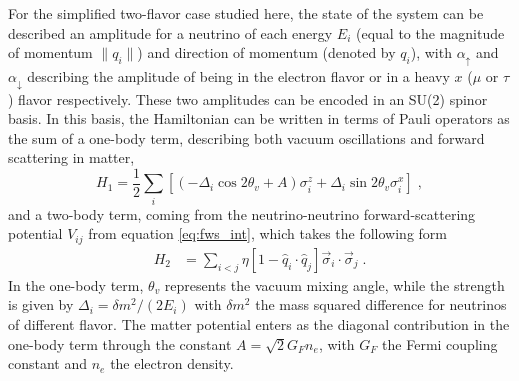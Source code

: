 \documentclass[Dual]{msu-thesis}
\begin{document}
For the simplified two-flavor case studied here, the state of the system can be described an amplitude for a neutrino of each energy $E_i$ (equal to the magnitude of momentum $\|{q}_i\|$) and direction of momentum (denoted by $q_i$), with $\alpha_\uparrow$ and $\alpha_\downarrow$ describing the amplitude of being in the electron flavor or in a heavy $x$ ($\mu$ or $\tau$) flavor respectively. These two amplitudes can be encoded in an SU(2) spinor
basis. In this basis, the Hamiltonian can be written in terms of Pauli operators as the sum of a one-body term, describing both vacuum oscillations and forward scattering in matter, 
\begin{equation}
\label{eq:Ham_init}
H_1  = \frac{1}{2} \sum_i \left[ \left(-\Delta_i\cos{2 \theta_v} + A\right)\sigma^z_i + \Delta_i\sin {2 \theta_v} \sigma^x_i \right]\;,
\end{equation}
and a two-body term, coming from the neutrino-neutrino forward-scattering potential $V_{ij}$ from equation \eqref{eq:fws_int}, which takes the following form~\cite{Pehlivan2011}
\begin{equation}
\begin{split}
H_2 & =  \sum_{i<j} \eta  [1- \hat{q}_i \cdot \hat{q}_j ] \vec{\sigma}_i \cdot \vec{\sigma}_j\;.
\end{split}
\end{equation}
In the one-body term, $\theta_v$ represents the vacuum mixing angle, while the strength is given by $\Delta_i = \delta m^2/(2 E_i)$ with $\delta m^2$ the mass squared difference for neutrinos of different flavor. The matter potential enters as the diagonal contribution in the one-body term through the constant $A = \sqrt{2} G_F n_e$, with $G_F$ the Fermi coupling constant and $n_e$ the electron density.
\end{document}
